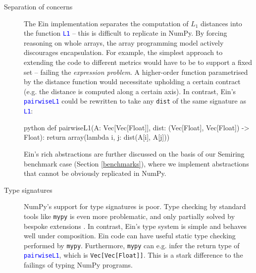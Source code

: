 \begin{description}
    \item[Separation of concerns] The Ein implementation separates the computation of $L_1$ distances into the function \textcolor{blue}{\texttt{L1}} -- this is difficult to replicate in NumPy. By forcing reasoning on whole arrays, the array programming model actively discourages encapsulation. For example, the simplest approach to extending the code to different metrics would have to be to support a fixed set -- failing the \textit{expression problem}. A higher-order function parametrised by the distance function would necessitate upholding a certain contract (e.g. the distance is computed along a certain axis). In contrast, Ein's \textcolor{blue}{\texttt{pairwiseL1}} could be rewritten to take any \texttt{dist} of the same signature as \textcolor{blue}{\texttt{L1}}:
    \begin{center}
    \begin{cminted}{python}
def pairwiseL1(A: Vec[Vec[Float]], dist: (Vec[Float], Vec[Float]) -> Float):
    return array(lambda i, j: dist(A[i], A[j]))
    \end{cminted}
    \end{center}
    Ein's rich abstractions are further discussed on the basis of our Semiring benchmark case (Section \ref{benchmarks}), where we implement abstractions that cannot be obviously replicated in NumPy.
    \item[Type signatures] NumPy's support for type signatures is poor. Type checking by standard tools like \texttt{mypy} is even more problematic, and only partially solved by bespoke extensions \cite{liu2020type}. In contrast, Ein's type system is simple and behaves well under composition. Ein code can have useful static type checking performed by \texttt{mypy}. Furthermore, \texttt{mypy} can e.g. infer the return type of \textcolor{blue}{\texttt{pairwiseL1}}, which is \texttt{Vec[Vec[Float]]}. This is a stark difference to the failings of typing NumPy programs.
\end{description}


